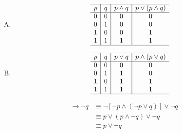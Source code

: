 {{        %
        \begin{practices}
            \begin{enumerate}[A.]
                \item
                {
                    \begin{table}[H]
                        \[
                            \begin{array}{c|c|c|c}
                                \hline
                                p & q & p \wedge q & p \vee (p \wedge q) \\
                                \hline
                                0 & 0 & 0 & 0 \\
                                0 & 1 & 0 & 0 \\
                                1 & 0 & 0 & 1 \\
                                1 & 1 & 1 & 1 \\
                                \hline
                           \end{array}
                       \]
                    \end{table}
                }
                \item
                {
                    \begin{table}[H]
                        \[
                            \begin{array}{c|c|c|c}
                                \hline
                                p & q & p \vee q & p \wedge (p \vee q) \\
                                \hline
                                0 & 0 & 0 & 0 \\
                                0 & 1 & 1 & 0 \\
                                1 & 0 & 1 & 1 \\
                                1 & 1 & 1 & 1 \\
                                \hline
                           \end{array}
                       \]
                    \end{table}
                }
            \end{enumerate}
        \end{practices}

        \begin{practices}
            \begin{align*}
                [\neg p \wedge (p \rightarrow q)] \rightarrow \neg q
                &\equiv \neg [\neg p \wedge (\neg p \vee q)] \vee \neg q \\
                &\equiv p \vee (p \wedge \neg q) \vee \neg q \\
                &\equiv p \vee \neg q
            \end{align*}


\end{practices}}}
